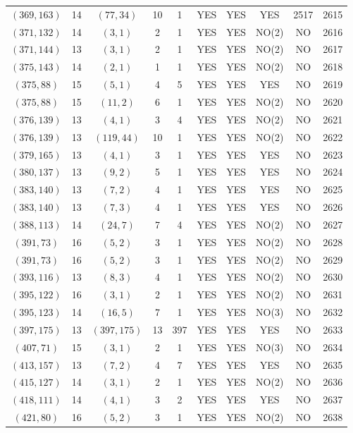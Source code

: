 \begin{longtable}{|c|c|c|c|c|c|c|c|c|c|}
$(369, 163)$ & 14 & $(77, 34)$ & 10 & 1 & YES & YES & YES & 2517 & 2615\\
$(371, 132)$ & 14 & $(3, 1)$ & 2 & 1 & YES & YES & NO(2) & NO & 2616\\
$(371, 144)$ & 13 & $(3, 1)$ & 2 & 1 & YES & YES & NO(2) & NO & 2617\\
$(375, 143)$ & 14 & $(2, 1)$ & 1 & 1 & YES & YES & NO(2) & NO & 2618\\
$(375, 88)$ & 15 & $(5, 1)$ & 4 & 5 & YES & YES & YES & NO & 2619\\
$(375, 88)$ & 15 & $(11, 2)$ & 6 & 1 & YES & YES & NO(2) & NO & 2620\\
$(376, 139)$ & 13 & $(4, 1)$ & 3 & 4 & YES & YES & NO(2) & NO & 2621\\
$(376, 139)$ & 13 & $(119, 44)$ & 10 & 1 & YES & YES & NO(2) & NO & 2622\\
$(379, 165)$ & 13 & $(4, 1)$ & 3 & 1 & YES & YES & YES & NO & 2623\\
$(380, 137)$ & 13 & $(9, 2)$ & 5 & 1 & YES & YES & YES & NO & 2624\\
$(383, 140)$ & 13 & $(7, 2)$ & 4 & 1 & YES & YES & YES & NO & 2625\\
$(383, 140)$ & 13 & $(7, 3)$ & 4 & 1 & YES & YES & YES & NO & 2626\\
$(388, 113)$ & 14 & $(24, 7)$ & 7 & 4 & YES & YES & NO(2) & NO & 2627\\
$(391, 73)$ & 16 & $(5, 2)$ & 3 & 1 & YES & YES & NO(2) & NO & 2628\\
$(391, 73)$ & 16 & $(5, 2)$ & 3 & 1 & YES & YES & NO(2) & NO & 2629\\
$(393, 116)$ & 13 & $(8, 3)$ & 4 & 1 & YES & YES & NO(2) & NO & 2630\\
$(395, 122)$ & 16 & $(3, 1)$ & 2 & 1 & YES & YES & NO(2) & NO & 2631\\
$(395, 123)$ & 14 & $(16, 5)$ & 7 & 1 & YES & YES & NO(3) & NO & 2632\\
$(397, 175)$ & 13 & $(397, 175)$ & 13 & 397 & YES & YES & YES & NO & 2633\\
$(407, 71)$ & 15 & $(3, 1)$ & 2 & 1 & YES & YES & NO(3) & NO & 2634\\
$(413, 157)$ & 13 & $(7, 2)$ & 4 & 7 & YES & YES & YES & NO & 2635\\
$(415, 127)$ & 14 & $(3, 1)$ & 2 & 1 & YES & YES & NO(2) & NO & 2636\\
$(418, 111)$ & 14 & $(4, 1)$ & 3 & 2 & YES & YES & YES & NO & 2637\\
$(421, 80)$ & 16 & $(5, 2)$ & 3 & 1 & YES & YES & NO(2) & NO & 2638\\

\end{longtable}
